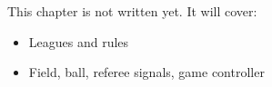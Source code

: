 \label{ch:rc1}
\begin{keyidea}
This chapter is not written yet. It will cover:
\begin{itemize}[nosep]
  \item Leagues and rules
  \item Field, ball, referee signals, game controller
\end{itemize}
\end{keyidea}
